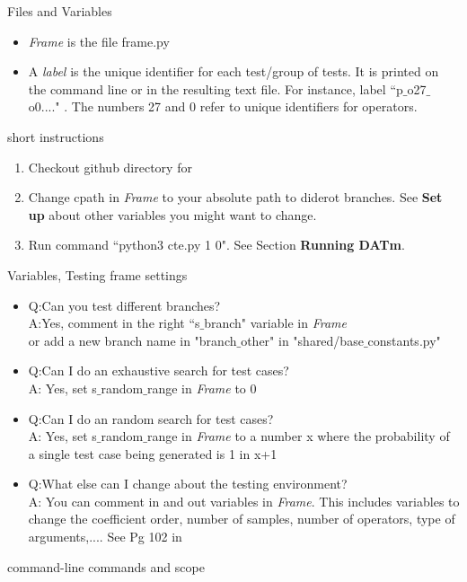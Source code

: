 
\begin{description}[noitemsep]
\item [Lingo] Files and Variables
\begin{itemize}[noitemsep]
 \item \textit{Frame} is the file frame.py
 \item  A  \textit{label} is the unique identifier for each test/group of tests. It is printed on the command line or in the resulting text file.
 For instance, label ``p$\_$o27$\_$o0...." . The numbers 27 and 0 refer to unique identifiers for operators.
 \end{itemize}
\item [Getting Started] short instructions
\begin{enumerate}
\item Checkout github directory for \datm{}
\item Change cpath in \textit{Frame} to your absolute path to diderot branches. See \textbf{Set up} about other variables you might want to change.
\item Run command ``python3 cte.py 1 0". See Section \textbf{Running DATm}.
\end{enumerate}
\item [Set up] Variables, Testing frame settings
\begin{itemize}[noitemsep]
\item Q:Can you test different branches? \\ 
A:Yes, comment in the right  ``s$\_$branch" variable in \textit{Frame}  \\
\tab or add a new branch name in "branch$\_$other" in "shared/base$\_$constants.py"
\item Q:Can I do an exhaustive search for test cases? \\
A: Yes, set s$\_$random$\_$range in \textit{Frame}  to 0
\item Q:Can I do an random search for test cases? \\
A: Yes, set s$\_$random$\_$range in \textit{Frame} to a number x where the probability of a single test case being generated is 1 in x+1
\item Q:What else can I change about the testing environment? \\
A: You can comment in and out variables in \textit{Frame}. This includes variables to change the coefficient order, number of samples, number of operators, type of arguments,.... See Pg 102 in \diss{}
\end{itemize}
\item [Running DATm] command-line commands and scope

\end{description}
